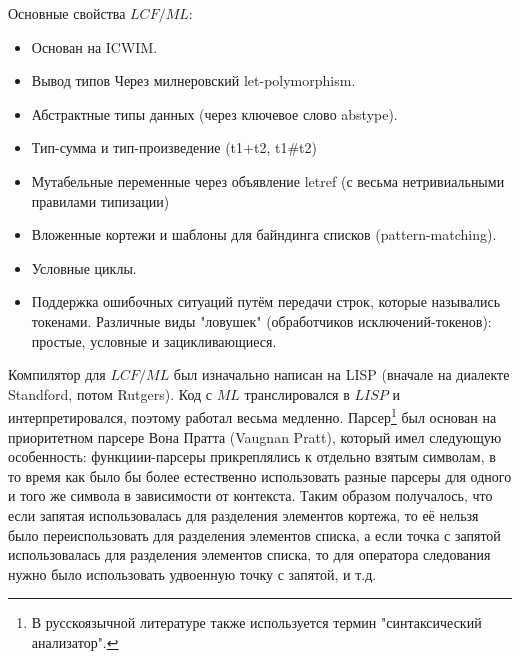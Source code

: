 \documentclass[14pt]{matmex-diploma-custom}
\begin{document}
Основные свойства $LCF/ML$:
\begin{itemize}
  \item Основан на ICWIM.
  \item Вывод типов Через милнеровский let-polymorphism.
  \item Абстрактные типы данных (через ключевое слово abstype).
  \item Тип-сумма и тип-произведение (t1+t2, t1\#t2)
  \item Мутабельные переменные через объявление letref (с весьма нетривиальными правилами типизации)
  \item Вложенные кортежи и шаблоны для байндинга списков (pattern-matching).
  \item Условные циклы.
  \item Поддержка ошибочных ситуаций путём передачи строк, которые назывались токенами. Различные виды "ловушек" (обработчиков исключений-токенов): простые, условные и зацикливающиеся.
\end{itemize}


Компилятор для $LCF/ML$ был изначально написан на LISP (вначале на диалекте Standford, потом Rutgers). Код с $ML$ транслировался в $LISP$ и интерпретировался, поэтому работал весьма медленно. Парсер\footnote{В русскоязычной литературе также используется термин "синтаксический анализатор".} был основан на приоритетном парсере Вона Пратта (Vaugnan Pratt), который имел следующую особенность: функциии-парсеры прикреплялись к отдельно взятым символам, в то время как было бы более естественно использовать разные парсеры для одного и того же символа в зависимости от контекста. Таким образом получалось, что если запятая использовалась для разделения элементов кортежа, то её нельзя было переиспользовать для разделения элементов списка, а если точка с запятой использовалась для разделения элементов списка, то для оператора следования нужно было использовать удвоенную точку с запятой, и т.д.
\end{document}

